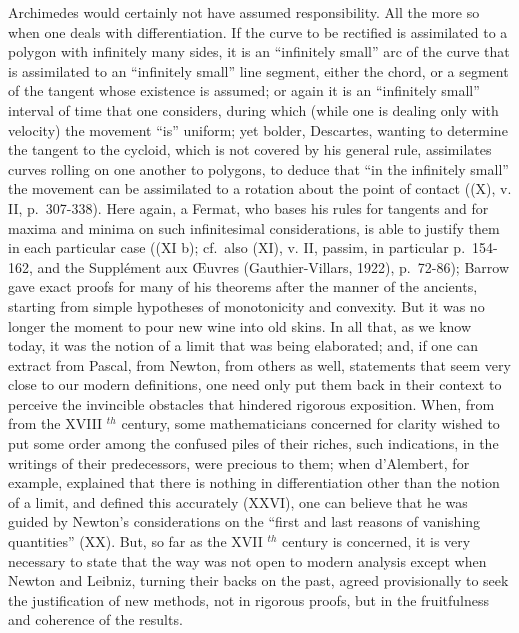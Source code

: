 Archimedes would certainly not have assumed responsibility. All the more so when one deals with differentiation. If the curve to be rectified is assimilated to a polygon with infinitely many sides, it is an ``infinitely small'' arc of the curve that is assimilated to an ``infinitely small'' line segment, either the chord, or a segment of the tangent whose existence is assumed; or again it is an ``infinitely small'' interval of time that one considers, during which (while one is dealing only with velocity) the movement ``is'' uniform; yet bolder, Descartes, wanting to determine the tangent to the cycloid, which is not covered by his general rule, assimilates curves rolling on one another to polygons, to deduce that ``in the infinitely small'' the movement can be assimilated to a rotation about the point of contact ((X), v. II, p.~307-338). Here again, a Fermat, who bases his rules for tangents and for maxima and minima on such infinitesimal considerations, is able to justify them in each particular case ((XI b); cf.~also (XI), v. II, passim, in particular p.~154-162, and the Supplément aux Œuvres (Gauthier-Villars, 1922), p.~72-86); Barrow gave exact proofs for many of his theorems after the manner of the ancients, starting from simple hypotheses of monotonicity and convexity. But it was no longer the moment to pour new wine into old skins. In all that, as we know today, it was the notion of a limit that was being elaborated; and, if one can extract from Pascal, from Newton, from others as well, statements that seem very close to our modern definitions, one need only put them back in their context to perceive the invincible obstacles that hindered rigorous exposition. When, from from the XVIII \(^{th}\) century, some mathematicians concerned for clarity wished to put some order among the confused piles of their riches, such indications, in the writings of their predecessors, were precious to them; when d'Alembert, for example, explained that there is nothing in differentiation other than the notion of a limit, and defined this accurately (XXVI), one can believe that he was guided by Newton's considerations on the ``first and last reasons of vanishing quantities'' (XX). But, so far as the XVII \(^{th}\) century is concerned, it is very necessary to state that the way was not open to modern analysis except when Newton and Leibniz, turning their backs on the past, agreed provisionally to seek the justification of new methods, not in rigorous proofs, but in the fruitfulness and coherence of the results.

